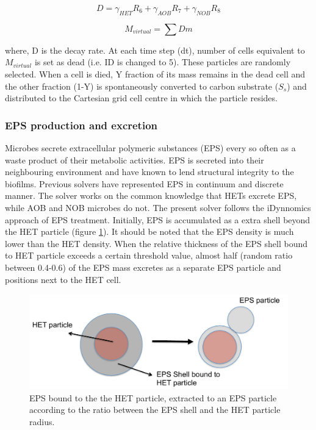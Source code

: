 \documentclass[11pt,a4paper,openright]{article}
\begin{document}
\begin{equation}
\label{eq:DR}
D = \gamma_{HET}R_{6} + \gamma_{AOB}R_{7} + \gamma_{NOB}R_{8}
\end{equation}

\begin{equation}
\label{eq:DR1}
M_{virtual} = \sum Dm
\end{equation}

where, D is the decay rate. At each time step (dt), number of cells equivalent to $M_{virtual}$ is set as dead (i.e. ID is changed to 5). These particles are randomly selected. When a cell is died, Y fraction of its mass remains in the dead cell and the other fraction (1-Y) is spontaneously converted to carbon substrate ($S_s$) and distributed to the Cartesian grid cell centre in which the particle resides. 

\subsubsection{EPS production and excretion}\label{EPSmol}
Microbes secrete extracellular polymeric substances (EPS) every so often as a waste product of their metabolic activities. EPS is secreted into their neighbouring environment and have known to lend structural integrity to the biofilms. Previous solvers have represented EPS in continuum and discrete manner. The solver works on the common knowledge that HETs excrete EPS, while AOB and NOB microbes do not. The present solver follows the iDynnomics approach of EPS treatment. Initially, EPS is accumulated as a extra shell beyond the HET particle (figure \ref{fig:EPScr}). It should be noted that the EPS density is much lower than the HET density. When the relative thickness of the EPS shell bound to HET particle exceeds a certain threshold value, almost half (random ratio between 0.4-0.6) of the EPS mass excretes as a separate EPS particle and positions next to the HET cell.

\begin{figure}[H]
\begin{center}
  \includegraphics[width=0.6\columnwidth]{Figs/EPScrit.pdf}
\caption{EPS bound to the the HET particle, extracted to an EPS particle according to the ratio between the EPS shell and the HET particle radius.}
\label{fig:EPScr}       %
\end{center}
\end{figure}  
\end{document}
